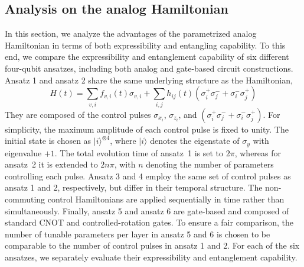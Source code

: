\documentclass[twocolumn,
pra,aps,superscriptaddress,showpacs,amsmath,amssymb]{revtex4-2}
\begin{document}
\subsection{Analysis on the analog Hamiltonian}
In this section, we analyze the advantages of the parametrized analog Hamiltonian in terms of both expressibility and entangling capability. To this end, we compare the expressibility and entanglement capability of six different four-qubit ansatzes, including both analog and gate-based circuit constructions.
Ansatz 1 and ansatz 2 share the same underlying structure as the Hamiltonian, 
\begin{equation}
    H(t) = \sum_{v,i}f_{v,i}(t)\sigma_{v,i} + \sum_{i,j}h_{ij}(t)(\sigma_i^{+}\sigma_j^{-}+\sigma_i^{-}\sigma_j^{+})
\label{eq:H_transmon}
\end{equation}
They are composed of the control pulses $\sigma_{x_i}$, $\sigma_{z_i}$, and $(\sigma_i^{+}\sigma_j^{-} + \sigma_i^{-}\sigma_j^{+})$. For simplicity, the maximum amplitude of each control pulse is fixed to unity. The initial state is chosen as $|i\rangle^{\otimes 4}$, where $|i\rangle$ denotes the eigenstate of $\sigma_y$ with eigenvalue $+1$. The total evolution time of ansatz~1 is set to $2\pi$, whereas for ansatz~2 it is extended to $2n\pi$, with $n$ denoting the number of parameters controlling each pulse.
Ansatz 3 and 4 employ the same set of control pulses as ansatz 1 and 2, respectively, but differ in their temporal structure. The non-commuting control Hamiltonians are applied sequentially in time rather than simultaneously. Finally, ansatz 5 and ansatz 6 are gate-based and composed of standard CNOT and controlled-rotation gates. To ensure a fair comparison, the number of tunable parameters per layer in ansatz 5 and 6 is chosen to be comparable to the number of control pulses in ansatz 1 and 2. For each of the six ansatzes, we separately evaluate their expressibility and entanglement capability.
\end{document}
